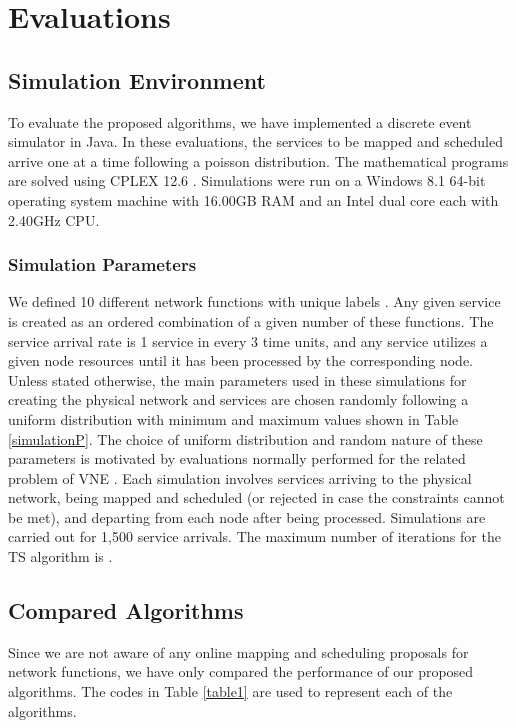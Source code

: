 \documentclass[conference]{IEEEtran}
\begin{document}
\section{Evaluations}\label{evaluation}

\subsection{Simulation Environment}

To evaluate the proposed algorithms, we have implemented a discrete event simulator in Java. In these evaluations, the services to be mapped and scheduled arrive one at a time following a poisson distribution. The mathematical programs are solved using CPLEX 12.6 \cite{CPLEX12.6}. Simulations were run on a Windows 8.1 64-bit operating system machine with 16.00GB RAM and an Intel dual core each with 2.40GHz CPU. 

\subsubsection{Simulation Parameters}
We defined 10 different network functions with unique labels . Any given service is created as an ordered combination of a given number of these functions. The service arrival rate is 1 service in every 3 time units, and any service utilizes a given node resources until it has been processed by the corresponding node. Unless stated otherwise, the main parameters used in these simulations for creating the physical network and services are chosen randomly following a uniform distribution with minimum and maximum values  shown in Table \ref{simulationP}. The choice of uniform distribution and random nature of these parameters is motivated by evaluations normally performed for the related problem of VNE \cite{Fischer13, neural, sdn}. Each simulation involves services arriving to the physical network, being mapped and scheduled (or rejected in case the constraints cannot be met), and departing from each node after being processed. Simulations are carried out for 1,500 service arrivals. The maximum number of iterations  for the TS algorithm is .

\subsection{Compared Algorithms}
Since we are not aware of any online mapping and scheduling proposals for network functions, we have only compared the performance of our proposed algorithms. The codes in Table \ref{table1} are used to represent each of the algorithms.
\end{document}
